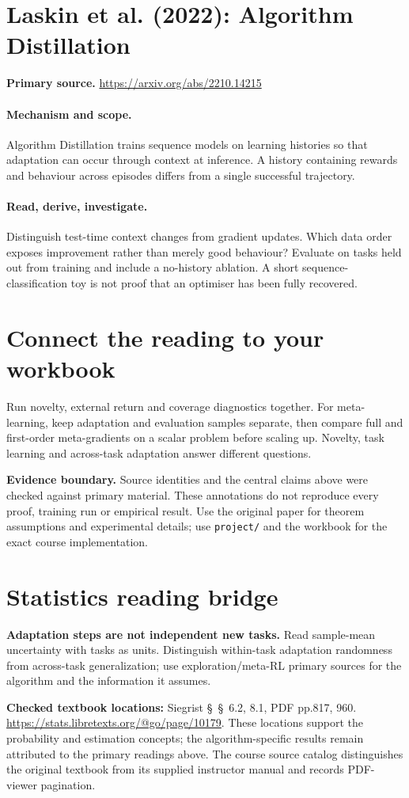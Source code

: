 \documentclass[11pt]{scrartcl}
\begin{document}
\section{Laskin et al. (2022): Algorithm Distillation}
\noindent\textbf{Primary source.} \url{https://arxiv.org/abs/2210.14215}

\paragraph{Mechanism and scope.} Algorithm Distillation trains sequence models on learning histories so that adaptation can occur through context at inference. A history containing rewards and behaviour across episodes differs from a single successful trajectory.

\paragraph{Read, derive, investigate.} Distinguish test-time context changes from gradient updates. Which data order exposes improvement rather than merely good behaviour? Evaluate on tasks held out from training and include a no-history ablation. A short sequence-classification toy is not proof that an optimiser has been fully recovered.

\section*{Connect the reading to your workbook}
Run novelty, external return and coverage diagnostics together. For meta-learning, keep adaptation and evaluation samples separate, then compare full and first-order meta-gradients on a scalar problem before scaling up. Novelty, task learning and across-task adaptation answer different questions.

\noindent\textbf{Evidence boundary.} Source identities and the central claims above were checked against primary material. These annotations do not reproduce every proof, training run or empirical result. Use the original paper for theorem assumptions and experimental details; use \texttt{project/} and the workbook for the exact course implementation.
\section*{Statistics reading bridge}
\textbf{Adaptation steps are not independent new tasks.} Read sample-mean uncertainty with tasks as units. Distinguish within-task adaptation randomness from across-task generalization; use exploration/meta-RL primary sources for the algorithm and the information it assumes.

\textbf{Checked textbook locations:} Siegrist \S~\S~6.2, 8.1, PDF pp.817, 960. \url{https://stats.libretexts.org/@go/page/10179}. These locations support the probability and estimation concepts; the algorithm-specific results remain attributed to the primary readings above. The course source catalog distinguishes the original textbook from its supplied instructor manual and records PDF-viewer pagination.
\end{document}
